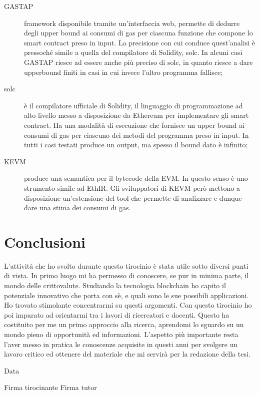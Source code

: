 \documentclass[a4paper,10pt]{article}
\begin{document}
\begin{description} %
  \item[GASTAP] framework disponibile tramite un'interfaccia web, permette di dedurre degli upper bound ai consumi di gas per ciascuna funzione che compone lo smart contract preso in input. La precisione con cui conduce quest'analisi è pressoché simile a quella del compilatore di Solidity, solc. In alcuni casi GASTAP riesce ad essere anche più preciso di solc, in quanto riesce a dare upperbound finiti in casi in cui invece l'altro programma fallisce;
  \item[solc] è il compilatore ufficiale di Solidity, il linguaggio di programmazione ad alto livello messo a disposizione da Ethereum per implementare gli smart contract. Ha una modalità di esecuzione che fornisce un upper bound ai consumi di gas per ciascuno dei metodi del programma preso in input. In tutti i casi testati produce un output, ma spesso il bound dato è infinito;
  \item[KEVM] produce una semantica per il bytecode della EVM. In questo senso è uno strumento simile ad EthIR. Gli sviluppatori di KEVM però mettono a disposizione un'estensione del tool che permette di analizzare e dunque dare una stima dei consumi di gas.
\end{description}


\section{Conclusioni}

L'attività che ho svolto durante questo tirocinio è stata utile sotto diversi punti di vista.\newline
In primo luogo mi ha permesso di conoscere, se pur in minima parte, il mondo delle crittovalute. Studiando la tecnologia blockchain ho capito il potenziale innovativo che porta con sè, e quali sono le sue possibili applicazioni. Ho trovato stimolante concentrarmi su questi argomenti.\newline
Con questo tirocinio ho poi imparato ad orientarmi tra i lavori di ricercatori e docenti. Questo ha costituito per me un primo approccio alla ricerca, aprendomi lo sguardo su un mondo pieno di opportunità ed informazioni.\newline
L'aspetto più importante resta l'aver messo in pratica le conoscenze acquisite in questi anni per svolgere un lavoro critico ed ottenere del materiale che mi servirà per la redazione della tesi.


\vspace{30mm}

\par
\noindent
\begin{minipage}[t]{0.47\textwidth}
{\large{Data}}
\end{minipage}
\hfill
\begin{minipage}[t]{0.47\textwidth}\raggedleft
{\large{Firma tirocinante\newline
\newline
\newline
Firma tutor\newline}}
\end{minipage}
\end{document}
